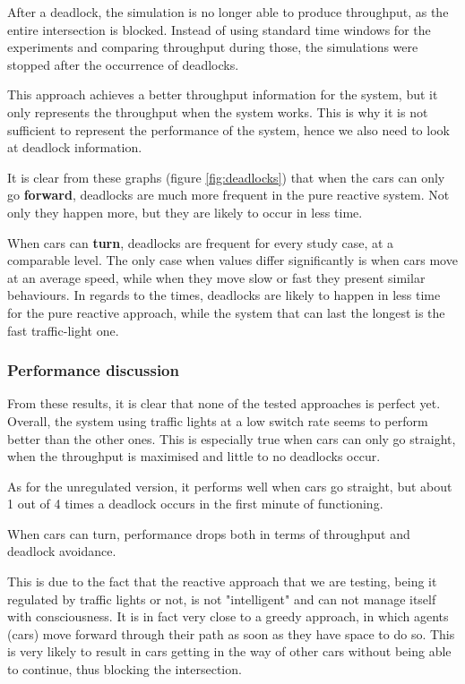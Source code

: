 After a deadlock, the simulation is no longer able to produce throughput, as the entire intersection is blocked.
Instead of using standard time windows for the experiments and comparing throughput during those, the simulations were stopped after the occurrence of deadlocks.

This approach achieves a better throughput information for the system, but it only represents the throughput when the system works.
This is why it is not sufficient to represent the performance of the system, hence we also need to look at deadlock information.


It is clear from these graphs (figure \ref{fig:deadlocks}) that when the cars can only go \textbf{forward}, deadlocks are much more frequent in the pure reactive system.
Not only they happen more, but they are likely to occur in less time.


When cars can \textbf{turn}, deadlocks are frequent for every study case, at a comparable level.
The only case when values differ significantly is when cars move at an average speed, while when they move slow or fast they present similar behaviours.
In regards to the times, deadlocks are likely to happen in less time for the pure reactive approach, while the system that can last the longest is the fast traffic-light one.


\subsubsection{Performance discussion}
From these results, it is clear that none of the tested approaches is perfect yet.
Overall, the system using traffic lights at a low switch rate seems to perform better than the other ones.
This is especially true when cars can only go straight, when the throughput is maximised and little to no deadlocks occur.

As for the unregulated version, it performs well when cars go straight, but about 1 out of 4 times a deadlock occurs in the first minute of functioning.

When cars can turn, performance drops both in terms of throughput and deadlock avoidance.

This is due to the fact that the reactive approach that we are testing, being it regulated by traffic lights or not, is not "intelligent" and can not manage itself with consciousness.
It is in fact very close to a greedy approach, in which agents (cars) move forward through their path as soon as they have space to do so.
This is very likely to result in cars getting in the way of other cars without being able to continue, thus blocking the intersection.


